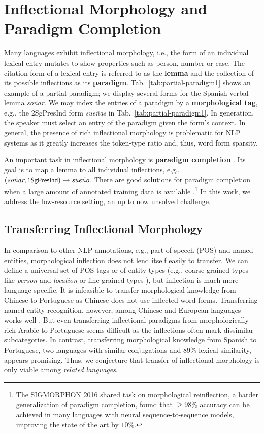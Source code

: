 \documentclass[11pt,letterpaper]{article}
\newcommand{\word}[1]{{\em #1}}
\newcommand{\mtag}[1]{{\small{\textsf{#1}}}}
\def\tabref#1{Tab.~\ref{tab:#1}}
\begin{document}
\section{Inflectional Morphology and Paradigm Completion}
Many languages exhibit inflectional morphology, i.e.,
the form of an individual lexical entry mutates to show properties
such as person, number or case. The citation form of a lexical entry
is referred to as the {\bf lemma} and the collection of its possible
inflections as its {\bf
  paradigm}. \tabref{partial-paradigm1} shows an example of a partial
paradigm; we
display several forms for the Spanish verbal lemma \word{so\~{n}ar}. We
may index the entries of a paradigm by a {\bf morphological tag}, e.g.,
the \mtag{2SgPresInd} form \word{sue\~{n}as}
in \tabref{partial-paradigm1}. In generation, the speaker must select
an entry of the paradigm  given 
the form's context. In general, the presence of rich
inflectional morphology is problematic for NLP systems as it greatly
increases the token-type ratio and, thus, word form sparsity.

An important  task in  inflectional morphology
is {\bf paradigm completion}
\cite{durrett2013supervised,ahlberg2014semi,nicolai2015inflection,CotterellPE15,FaruquiTND16}. Its goal is to map a lemma to all individual inflections, e.g.,
$(\text{\word{so\~{n}ar}}, \text{\mtag{1SgPresInd}}) \mapsto \text{\word{sue\~{n}o}}$.
There are good solutions for paradigm
completion when a large amount of annotated training
data is available \cite{cotterell-et-al-2016-shared}.\footnote{The
  SIGMORPHON 2016 shared task
  \cite{cotterell-et-al-2016-shared} on
morphological reinflection,
 a harder generalization of
  paradigm completion, found
that $\geq 98\%$
accuracy can be achieved in many languages with neural
sequence-to-sequence models, improving the state of the art
by 
$10\%$.}  In this work, we address the low-resource
setting, an up to now 
unsolved challenge.


\subsection{Transferring Inflectional Morphology}
In comparison to other NLP annotations, e.g., part-of-speech
(POS) and named entities, morphological inflection does not
lend itself easily to transfer. We can define a universal
set of POS tags \cite{petrov2011universal} or of entity types
(e.g., coarse-grained types like {\em person} and {\em
  location} or fine-grained types \cite{YaghoobzadehS15}),
but inflection is much more language-specific.
It is
infeasible to transfer morphological knowledge from Chinese
to Portuguese as Chinese does not use inflected word
forms. Transferring named entity recognition, however, among
Chinese and European languages works well
\cite{WangM14}. But even transferring inflectional paradigms
from morphologically rich Arabic to Portuguese seems
difficult as the inflections often mark dissimilar
subcategories.  In contrast,
transferring morphological knowledge from Spanish to
Portuguese, two languages with similar conjugations and 89\%
lexical similarity, appears promising. 
Thus, we conjecture that transfer of
inflectional morphology is only viable among {\em related
  languages}.
\end{document}
